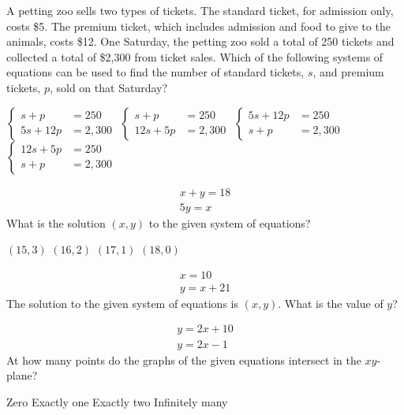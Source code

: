 \newpage



\question[1]
A petting zoo sells two types of tickets. The standard ticket, for admission only, costs \$5. The premium ticket, which includes admission and food to give to the animals, costs \$12. One Saturday, the petting zoo sold a total of 250 tickets and collected a total of \$2,300 from ticket sales. Which of the following systems of equations can be used to find the number of standard tickets, $s$, and premium tickets, $p$, sold on that Saturday?
\begin{choices}
  \CorrectChoice $\left\{\begin{aligned} s+p&=250 \\ 5s+12p&=2,300 \end{aligned}\right.$
  \choice $\left\{\begin{aligned} s+p&=250 \\ 12s+5p&=2,300 \end{aligned}\right.$
  \choice $\left\{\begin{aligned} 5s+12p&=250 \\ s+p&=2,300 \end{aligned}\right.$
  \choice $\left\{\begin{aligned} 12s+5p&=250 \\ s+p&=2,300 \end{aligned}\right.$
\end{choices}

\question[1]
\[\begin{gathered}
  x+y=18 \\
  5y=x
  \end{gathered}\]
What is the solution $(x,y)$ to the given system of equations?
\begin{choices}
  \CorrectChoice $(15,3)$
  \choice $(16,2)$
  \choice $(17,1)$
  \choice $(18,0)$
\end{choices}


\question[1]
\[\begin{gathered}
  x=10 \\
  y=x+21
  \end{gathered}\]
The solution to the given system of equations is $(x,y)$. What is the value of $y$?
\begin{choices}
\end{choices}


\newpage



\question[1]
\[\begin{gathered}
  y=2x+10 \\
  y=2x-1
  \end{gathered}\]
At how many points do the graphs of the given equations intersect in the $xy$-plane?
\begin{choices}
  \CorrectChoice Zero
  \choice Exactly one
  \choice Exactly two
  \choice Infinitely many
\end{choices}

